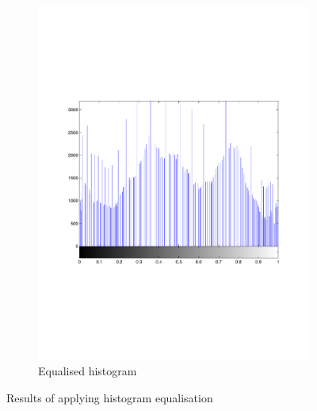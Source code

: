 \documentclass[a4paper]{article}
\begin{document}
\begin{figure}[h!]
\begin{subfigure}[b]{0.3\textwidth}
                \includegraphics[width=\textwidth]{q4-b-thist}
                \caption{Equalised histogram}
                \label{fig:ahe}
        \end{subfigure}
        \caption{Results of applying histogram equalisation}
        \label{fig:441compare}
\end{figure}
\end{document}
